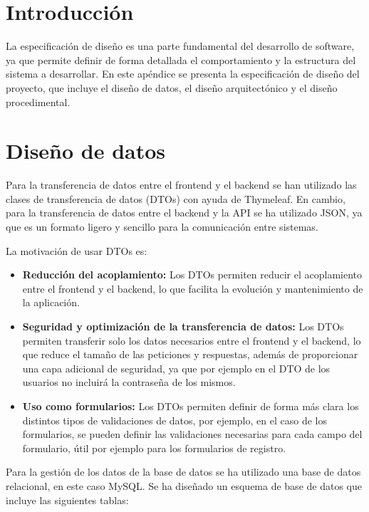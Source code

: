
\section{Introducción}
La especificación de diseño es una parte fundamental del desarrollo de software, ya que permite definir de forma detallada el comportamiento y la estructura del sistema a desarrollar. En este apéndice se presenta la especificación de diseño del proyecto, que incluye el diseño de datos, el diseño arquitectónico y el diseño procedimental.

\section{Diseño de datos}
Para la transferencia de datos entre el frontend y el backend se han utilizado las clases de transferencia de datos (DTOs) con ayuda de Thymeleaf. En cambio, para la transferencia de datos entre el backend y la API se ha utilizado JSON, ya que es un formato ligero y sencillo para la comunicación entre sistemas.

La motivación de usar DTOs es:
\begin{itemize}
    \item \textbf{Reducción del acoplamiento:} Los DTOs permiten reducir el acoplamiento entre el frontend y el backend, lo que facilita la evolución y mantenimiento de la aplicación.
    \item \textbf{Seguridad y optimización de la transferencia de datos:} Los DTOs permiten transferir solo los datos necesarios entre el frontend y el backend, lo que reduce el tamaño de las peticiones y respuestas, además de proporcionar una capa adicional de seguridad, ya que por ejemplo en el DTO de los usuarios no incluirá la contraseña de los mismos.
    \item \textbf{Uso como formularios:} Los DTOs permiten definir de forma más clara los distintos tipos de validaciones de datos, por ejemplo, en el caso de los formularios, se pueden definir las validaciones necesarias para cada campo del formulario, útil por ejemplo para los formularios de registro.
\end{itemize}





Para la gestión de los datos de la base de datos se ha utilizado una base de datos relacional, en este caso MySQL. Se ha diseñado un esquema de base de datos que incluye las siguientes tablas:

